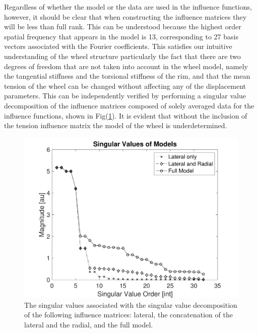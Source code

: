 \documentclass[journal]{IEEEtran}
\begin{document}
Regardless of whether the model or the data are used in the influence functions, however, it should be clear that when constructing the influence matrices they will be less than full rank.  This can be understood because the highest order spatial frequency that appears in the model is 13, corresponding to 27 basis vectors associated with the Fourier coefficients. This satisfies our intuitive understanding of the wheel structure particularly the fact that there are two degrees of freedom that are not taken into account in the wheel model, namely the tangential stiffness and the torsional stiffness of the rim, and that the mean tension of the wheel can be changed without affecting any of the displacement parameters. This can be independently verified by performing a singular value decomposition of the influence matrices composed of solely averaged data for the influence functions, shown in Fig(\ref{fig:svd}). It is evident that without the inclusion of the tension influence matrix the model of the wheel is underdetermined.  

\begin{figure}[!t]
\centering
\includegraphics[width=3.25 in]{./figs/svd}
\caption{The singular values associated with the singular value decomposition of the following influence matrices: lateral, the concatenation of the lateral and the radial, and the full model.}
\label{fig:svd}
\end{figure}
\end{document}
